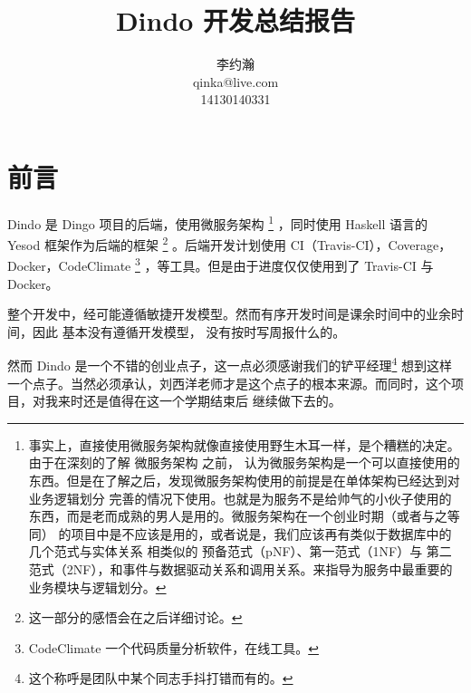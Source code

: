 \documentclass{dindo}
\title{Dindo 开发总结报告}
\author{李约瀚\\qinka@live.com\\14130140331}
\begin{document}
  \makecover
  \section*{前言}
   Dindo 是 Dingo 项目的后端，使用微服务架构
    \footnote{事实上，直接使用微服务架构就像直接使用野生木耳一样，是个糟糕的决定。由于在深刻的了解 微服务架构 之前，
    认为微服务架构是一个可以直接使用的东西。但是在了解之后，发现微服务架构使用的前提是在单体架构已经达到对业务逻辑划分
    完善的情况下使用。也就是为服务不是给帅气的小伙子使用的东西，而是老而成熟的男人是用的。微服务架构在一个创业时期（或者与之等同）
    的项目中是不应该是用的，或者说是，我们应该再有类似于数据库中的 几个范式与实体关系 相类似的 预备范式（pNF）、第一范式（1NF）与
    第二范式（2NF），和事件与数据驱动关系和调用关系。来指导为服务中最重要的业务模块与逻辑划分。}
  ，同时使用 Haskell 语言的 Yesod 框架作为后端的框架
    \footnote{这一部分的感悟会在之后详细讨论。}
  。后端开发计划使用 CI（Travis-CI），Coverage，Docker，CodeClimate
    \footnote{CodeClimate 一个代码质量分析软件，在线工具。}
  ，等工具。但是由于进度仅仅使用到了 Travis-CI 与 Docker。

  整个开发中，经可能遵循敏捷开发模型。然而有序开发时间是课余时间中的业余时间，因此 基本没有遵循开发模型，
  没有按时写周报什么的。

  然而 Dindo 是一个不错的创业点子，这一点必须感谢我们的铲平经理\footnote{这个称呼是团队中某个同志手抖打错而有的。}
  想到这样一个点子。当然必须承认，刘西洋老师才是这个点子的根本来源。而同时，这个项目，对我来时还是值得在这一个学期结束后
  继续做下去的。
\end{document}
